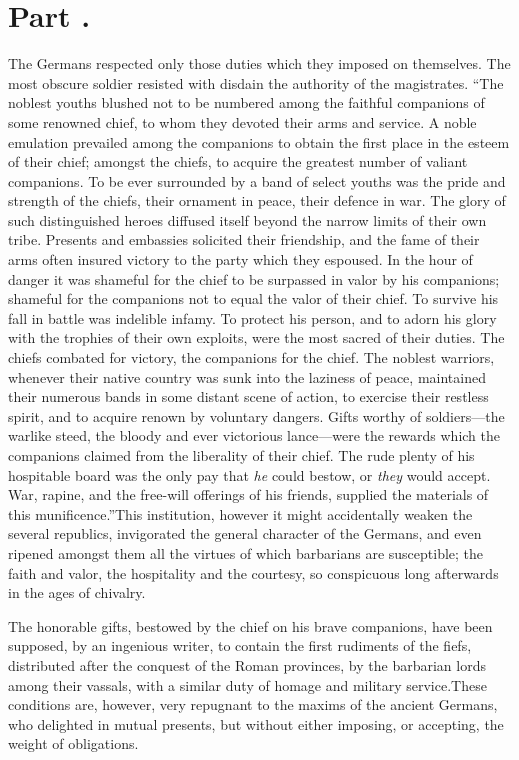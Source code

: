 \section{Part \thesection.}
\thispagestyle{simple}

The Germans respected only those duties which they imposed on
themselves. The most obscure soldier resisted with disdain the
authority of the magistrates. “The noblest youths blushed not to
be numbered among the faithful companions of some renowned chief,
to whom they devoted their arms and service. A noble emulation
prevailed among the companions to obtain the first place in the
esteem of their chief; amongst the chiefs, to acquire the
greatest number of valiant companions. To be ever surrounded by a
band of select youths was the pride and strength of the chiefs,
their ornament in peace, their defence in war. The glory of such
distinguished heroes diffused itself beyond the narrow limits of
their own tribe. Presents and embassies solicited their
friendship, and the fame of their arms often insured victory to
the party which they espoused. In the hour of danger it was
shameful for the chief to be surpassed in valor by his
companions; shameful for the companions not to equal the valor of
their chief. To survive his fall in battle was indelible infamy.
To protect his person, and to adorn his glory with the trophies
of their own exploits, were the most sacred of their duties. The
chiefs combated for victory, the companions for the chief. The
noblest warriors, whenever their native country was sunk into the
laziness of peace, maintained their numerous bands in some
distant scene of action, to exercise their restless spirit, and
to acquire renown by voluntary dangers. Gifts worthy of
soldiers—the warlike steed, the bloody and ever victorious
lance—were the rewards which the companions claimed from the
liberality of their chief. The rude plenty of his hospitable
board was the only pay that \textit{he} could bestow, or \textit{they} would
accept. War, rapine, and the free-will offerings of his friends,
supplied the materials of this munificence.”\footnotemark[53] This institution,
however it might accidentally weaken the several republics,
invigorated the general character of the Germans, and even
ripened amongst them all the virtues of which barbarians are
susceptible; the faith and valor, the hospitality and the
courtesy, so conspicuous long afterwards in the ages of chivalry.

The honorable gifts, bestowed by the chief on his brave
companions, have been supposed, by an ingenious writer, to
contain the first rudiments of the fiefs, distributed after the
conquest of the Roman provinces, by the barbarian lords among
their vassals, with a similar duty of homage and military
service.\footnotemark[54] These conditions are, however, very repugnant to the
maxims of the ancient Germans, who delighted in mutual presents,
but without either imposing, or accepting, the weight of
obligations.\footnotemark[55]

